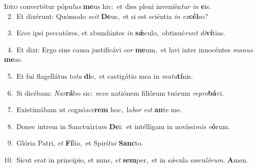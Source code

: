 \lettrine{\initial\textcolor{\initialcolor}{I}}{deo} convertétur pópu\textit{lus} \textbf{me}\-us hic:~\star et dies pleni invenién\textit{tur} \textit{in} \textbf{e}\-is.\\
{\numbfont\textcolor{\numbcolor}{~2.}}~Et dixérunt: Quómodo \textit{scit} \textbf{De}\-us,~\star et si est sciéntia \textit{in} \textit{ex}\-\textbf{cél}so?\par
{\numbfont\textcolor{\numbcolor}{~3.}}~Ecce ipsi peccatóres, et abundántes \textit{in} \textbf{sǽ}\-culo,~\star obtinué\textit{runt} \textit{di}\-\textbf{ví}tias.\par
{\numbfont\textcolor{\numbcolor}{~4.}}~Et dixi: Ergo sine causa justificávi \textit{cor} \textbf{me}\-um,~\star et lavi inter innocéntes \textit{ma}\-\textit{nus} \textbf{me}\-as.\par
{\numbfont\textcolor{\numbcolor}{~5.}}~Et fui flagellátus to\textit{ta} \textbf{di}\-e,~\star et castigátio mea in \textit{ma}\-\textit{tu}\textbf{tí}nis.\par
{\numbfont\textcolor{\numbcolor}{~6.}}~Si dicébam: \textit{Nar}\-\textbf{rá}bo sic:~\star ecce natiónem filiórum tuórum \textit{re}\-\textit{pro}\textbf{bá}vi.\par
{\numbfont\textcolor{\numbcolor}{~7.}}~Existimábam ut cognó\-\textit{sce}\-\textbf{rem} hoc,~\star la\textit{bor} \textit{est} \textbf{an}\-te me.\par
{\numbfont\textcolor{\numbcolor}{~8.}}~Donec intrem in Sanctuári\textit{um} \textbf{De}\-i:~\star et intélligam in novíssi\textit{mis} \textit{e}\-\textbf{ó}rum.\par
{\numbfont\textcolor{\numbcolor}{~9.}}~Glória Patri, \textit{et} \textbf{Fí}\-lio,~\star et Spirí\-\textit{tu}\-\textit{i} \textbf{Sanc}\-to.\par
{\numbfont\textcolor{\numbcolor}{10.}}~Sicut erat in princípio, et nunc, \textit{et} \textbf{sem}\-per,~\star et in sǽcula sæcu\-\textit{ló}\-\textit{rum}. \textbf{A}\-men.\par
